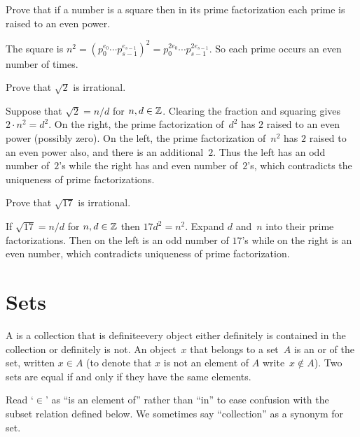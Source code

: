 \documentclass{ibl}  %
\begin{document}
\begin{problem}[\midlength] 
\begin{exes}
\begin{exercise} 
  Prove that if a number is a square then in its prime factorization 
  each prime is raised to an even power.
\end{exercise}
\begin{answer}
  The square is 
  $n^2=(p_0^{e_0}\cdots p_{s-1}^{e_{s-1}})^2=p_0^{2e_0}\cdots p_{s-1}^{2e_{s-1}}$.
  So each prime occurs an even number of times.  
\end{answer}
\begin{exercise} 
  Prove that $\sqrt{2}$ is irrational.
\end{exercise}
\begin{answer}
  Suppose that $\sqrt{2}=n/d$ for $n,d\in\mathbb{Z}$.
  Clearing the fraction and squaring gives $2\cdot n^2=d^2$.
  On the right, the prime factorization of~$d^2$ has $2$ raised to an even 
  power (possibly zero).
  On the left, the prime factorization of~$n^2$ has $2$ raised to an even power
  also, and there is an additional~$2$.
  Thus the left has an odd number of~$2$'s while the right has
  and even number of~$2$'s, which
  contradicts the uniqueness of prime factorizations.   
\end{answer}
\begin{exercise}[\maxlength] 
  Prove that $\sqrt{17}$ is irrational. %
\end{exercise}
\begin{answer}
  If $\sqrt{17}=n/d$ for $n,d\in\mathbb{Z}$ then $17d^2=n^2$.
  Expand $d$ and~$n$ into their prime factorizations.
  Then on the left is an odd number of $17$'s while on the right
  is an even number, which contradicts uniqueness of 
  prime factorization. 
\end{answer}
\end{exes}
\end{problem}










\chapter{Sets}
\begin{df}
A  is a collection that is definite\Dash every 
object either
definitely is contained in the collection or definitely is not.
An object~$x$ that belongs to a set~$A$ is an 
or 
of the set, written $x\in A$
(to denote that $x$ is not an element of $A$ write~$x\notin A$).
Two sets are equal if and only if they have the same elements.
\end{df}
\noindent Read `$\in$' as ``is an element of'' rather than ``in'' to ease
confusion with 
the subset relation defined below.
We sometimes say ``collection'' as a synonym for set.
\end{document}
